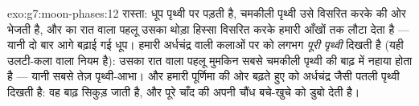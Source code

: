 \begin{solution}{exo:g7:moon-phases:12}
रास्ता: धूप पृथ्वी पर पड़ती है, चमकीली पृथ्वी उसे विसरित करके 
की ओर भेजती है, और  का रात वाला पहलू उसका थोड़ा हिस्सा विसरित
करके हमारी आँखों तक लौटा देता है --- यानी दो बार आगे बढ़ाई गई धूप।
हमारी अर्धचंद्र वाली कलाओं पर  को लगभग \emph{पूरी पृथ्वी}
दिखती है (यही उलटी-कला वाला नियम है): उसका रात वाला पहलू मुमकिन सबसे
चमकीली पृथ्वी की बाढ़ में नहाया होता है --- यानी सबसे तेज़ पृथ्वी-आभा।
और हमारी पूर्णिमा की ओर बढ़ते हुए  को अर्धचंद्र जैसी पतली
पृथ्वी दिखती है: वह बाढ़ सिकुड़ जाती है, और पूरे चाँद की अपनी चौंध
बचे-खुचे को डुबो देती है।
\end{solution}

